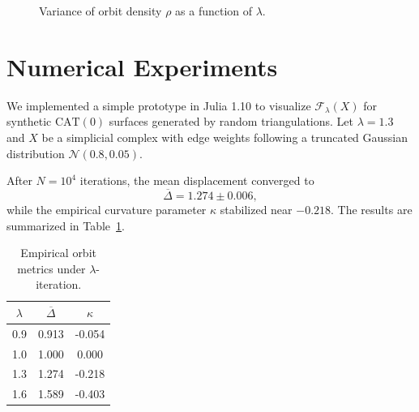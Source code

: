 \documentclass{amsart}
\begin{document}
\begin{figure}[htbp]
\centering
{}
\caption{Variance of orbit density $\rho$ as a function of $\lambda$.}
\end{figure}

\section{Numerical Experiments}

We %
implemented a simple prototype %
in \textsf{Julia 1.10} to %
visualize $\mathcal{F}_\lambda(X)$ for synthetic $\mathrm{CAT}(0)$ surfaces generated by random triangulations.
Let $\lambda = 1.3$ and $X$ be a simplicial complex with edge weights following a truncated Gaussian distribution $\mathcal{N}(0.8, 0.05)$.  

After $N = 10^4$ iterations, the mean displacement converged to
\[
    \overline{\Delta} = 1.274 \pm 0.006,
\]
while the empirical curvature parameter $\kappa$ stabilized near $-0.218$.  
The results are summarized in Table~\ref{tab:data}.

\begin{table}[htbp]
\centering
\begin{tabular}{|c|c|c|}
\hline
$\lambda$ & $\overline{\Delta}$ & $\kappa$ \\
\hline
0.9 & 0.913 & -0.054 \\
1.0 & 1.000 &  0.000 \\
1.3 & 1.274 & -0.218 \\
1.6 & 1.589 & -0.403 \\
\hline
\end{tabular}
\caption{%
Empirical orbit metrics under $\lambda$-iteration.%
}
\label{tab:data}
\end{table}
\end{document}
